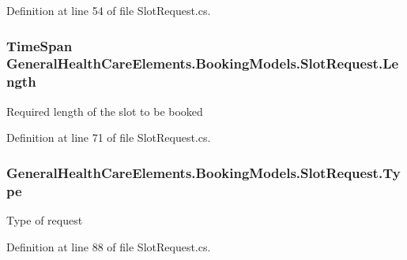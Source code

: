Definition at line 54 of file Slot\+Request.\+cs.

\subsubsection[{\texorpdfstring{Length}{Length}}]{\setlength{\rightskip}{0pt plus 5cm}Time\+Span General\+Health\+Care\+Elements.\+Booking\+Models.\+Slot\+Request.\+Length\hspace{0.3cm}{\ttfamily [get]}}\hypertarget{class_general_health_care_elements_1_1_booking_models_1_1_slot_request_a33de7d58c6e6759c5031e63472f9e7a7}{}\label{class_general_health_care_elements_1_1_booking_models_1_1_slot_request_a33de7d58c6e6759c5031e63472f9e7a7}


Required length of the slot to be booked 



Definition at line 71 of file Slot\+Request.\+cs.

\subsubsection[{\texorpdfstring{Type}{Type}}]{ General\+Health\+Care\+Elements.\+Booking\+Models.\+Slot\+Request.\+Type\hspace{0.3cm}{\ttfamily [get]}}\hypertarget{class_general_health_care_elements_1_1_booking_models_1_1_slot_request_ae6f718021172416e83368ed159c5f449}{}\label{class_general_health_care_elements_1_1_booking_models_1_1_slot_request_ae6f718021172416e83368ed159c5f449}


Type of request 



Definition at line 88 of file Slot\+Request.\+cs.


